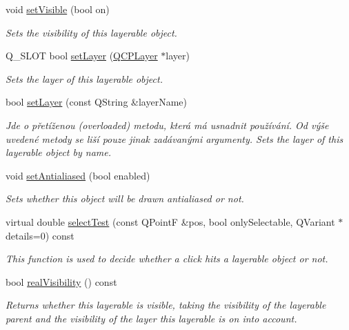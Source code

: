 \begin{DoxyCompactItemize}
\item 
void \hyperlink{classQCPLayerable_a3bed99ddc396b48ce3ebfdc0418744f8}{set\+Visible} (bool on)
\begin{DoxyCompactList}\small\item\em Sets the visibility of this layerable object. \end{DoxyCompactList}\item 
Q\+\_\+\+S\+L\+O\+T bool \hyperlink{classQCPLayerable_ab0d0da6d2de45a118886d2c8e16d5a54}{set\+Layer} (\hyperlink{classQCPLayer}{Q\+C\+P\+Layer} $\ast$layer)
\begin{DoxyCompactList}\small\item\em Sets the {\itshape layer} of this layerable object. \end{DoxyCompactList}\item 
bool \hyperlink{classQCPLayerable_ab25a0e7b897993b44447caee0f142083}{set\+Layer} (const Q\+String \&layer\+Name)
\begin{DoxyCompactList}\small\item\em Jde o přetíženou (overloaded) metodu, která má usnadnit používání. Od výše uvedené metody se liší pouze jinak zadávanými argumenty. Sets the layer of this layerable object by name. \end{DoxyCompactList}\item 
void \hyperlink{classQCPLayerable_a4fd43e89be4a553ead41652565ff0581}{set\+Antialiased} (bool enabled)
\begin{DoxyCompactList}\small\item\em Sets whether this object will be drawn antialiased or not. \end{DoxyCompactList}\item 
virtual double \hyperlink{classQCPLayerable_a4001c4d0dfec55598efa4d531f2179a9}{select\+Test} (const Q\+Point\+F \&pos, bool only\+Selectable, Q\+Variant $\ast$details=0) const 
\begin{DoxyCompactList}\small\item\em This function is used to decide whether a click hits a layerable object or not. \end{DoxyCompactList}\item 
bool \hyperlink{classQCPLayerable_a30809f7455e9794bca7b6c737622fa63}{real\+Visibility} () const 
\begin{DoxyCompactList}\small\item\em Returns whether this layerable is visible, taking the visibility of the layerable parent and the visibility of the layer this layerable is on into account. \end{DoxyCompactList}\end{DoxyCompactItemize}
